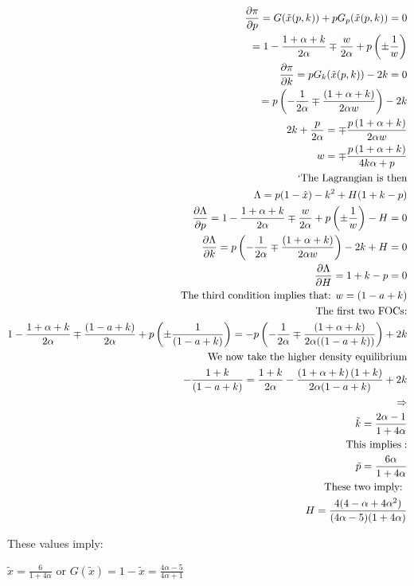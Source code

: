 \documentclass{article}
\begin{document}
\begin{align*}
\frac{\partial \pi}{\partial p} 
= 
G(\tilde{x}(p,k))+pG_p(\tilde{x}(p,k))
=0
\\
=
1-\frac{1+\alpha+k}{2\alpha}
\mp \frac{w}{2\alpha}
+p \left(\pm \frac{1}{w} \right)
\\
\frac{\partial \pi}{\partial k} =pG_k(\tilde{x}(p,k)) -2k
=0
\\
=p\left(-\frac{1}{2\alpha}
\mp \frac{\left(1+\alpha+k \right)}{2 \alpha w} 
\right) -2k
\\
2k+\frac{p}{2\alpha}=\mp \frac{p \left(1+\alpha+k \right)}{2 \alpha w} 
\\
w 
= \mp \frac{p \left(1+\alpha+k \right)}{4k \alpha +p}
\\
`\text{The Lagrangian is then} \\
\Lambda = p(1-\hat{x})-k^2+H(1+k-p) 
\\
\frac{\partial \Lambda}{\partial p}= 1-\frac{1+\alpha+k}{2\alpha}
\mp \frac{w}{2\alpha}
+p \left(\pm \frac{1}{w} \right)-H =0
\\
\frac{\partial \Lambda}{\partial k}=p\left(-\frac{1}{2\alpha}
\mp \frac{\left(1+\alpha+k \right)}{2 \alpha w} 
\right) -2k+H =0 
\\
\frac{\partial \Lambda}{\partial H} = 1+k-p =0
\\
\text{The third condition implies that: }
w = (1-a+k)
\\
\text{The first two FOCs:}
\\
1-\frac{1+\alpha+k}{2\alpha}
\mp \frac{(1-a+k)}{2\alpha}
+p \left(\pm \frac{1}{(1-a+k)} \right)
=-p\left(-\frac{1}{2\alpha}
\mp \frac{\left(1+\alpha+k \right)}{2 \alpha ((1-a+k))} 
\right) +2k \\
\text{We now take the higher density equilibrium}
\\
-\frac{1+k}{(1-a+k)} 
=\frac{1+k}{2\alpha}
- \frac{\left(1+\alpha+k \right)(1+k)}{2 \alpha (1-a+k)} 
 +2k \\
\Rightarrow
\\
\tilde{k} = \frac{2\alpha-1}{1+4\alpha} \\
\text{This implies}:
\\
\tilde{p} = \frac{6\alpha}{1+4\alpha}
\\
\text{These two imply: }
\\
H = \frac{4(4-\alpha+4\alpha^2)}{(4\alpha-5)(1+4\alpha)}
\end{align*}

These values imply: 

$\tilde{x}=\frac{6}{1+4\alpha}$
or $G(\tilde{x})=1-\tilde{x}= \frac{4\alpha-5}{4\alpha+1}$
\end{document}
